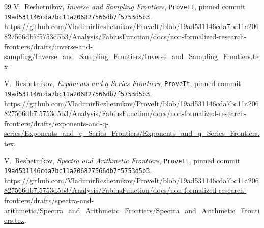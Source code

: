 \documentclass[11pt,oneside]{article}
\numberwithin{equation}{section}
\theoremstyle{definition}
\theoremstyle{remark}
\newcommand{\repo}{\texttt{ProveIt}}
\begin{document}
\begin{thebibliography}{99}
V.~Reshetnikov,
\newblock \emph{Inverse and Sampling Frontiers},
\newblock \repo, pinned commit
\nolinkurl{19ad531146cda7bc11a206827566db7f5753d5b3}.
\newblock \url{https://github.com/VladimirReshetnikov/ProveIt/blob/19ad531146cda7bc11a206827566db7f5753d5b3/Analysis/FabiusFunction/docs/non-formalized-research-frontiers/drafts/inverse-and-sampling/Inverse_and_Sampling_Frontiers/Inverse_and_Sampling_Frontiers.tex}.

V.~Reshetnikov,
\newblock \emph{Exponents and $q$-Series Frontiers},
\newblock \repo, pinned commit
\nolinkurl{19ad531146cda7bc11a206827566db7f5753d5b3}.
\newblock \url{https://github.com/VladimirReshetnikov/ProveIt/blob/19ad531146cda7bc11a206827566db7f5753d5b3/Analysis/FabiusFunction/docs/non-formalized-research-frontiers/drafts/exponents-and-q-series/Exponents_and_q_Series_Frontiers/Exponents_and_q_Series_Frontiers.tex}.

V.~Reshetnikov,
\newblock \emph{Spectra and Arithmetic Frontiers},
\newblock \repo, pinned commit
\nolinkurl{19ad531146cda7bc11a206827566db7f5753d5b3}.
\newblock \url{https://github.com/VladimirReshetnikov/ProveIt/blob/19ad531146cda7bc11a206827566db7f5753d5b3/Analysis/FabiusFunction/docs/non-formalized-research-frontiers/drafts/spectra-and-arithmetic/Spectra_and_Arithmetic_Frontiers/Spectra_and_Arithmetic_Frontiers.tex}.

\end{thebibliography}
\endgroup
\end{document}
